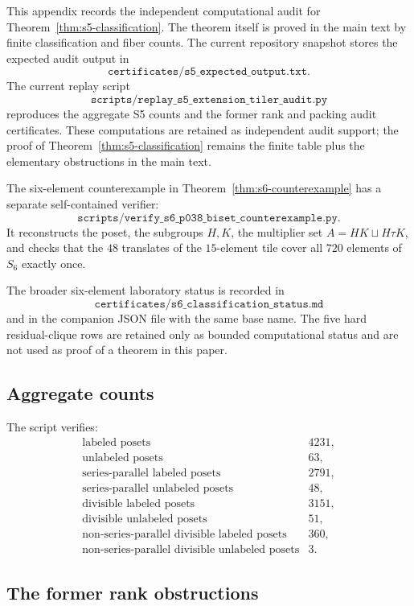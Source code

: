 This appendix records the independent computational audit for
Theorem~\ref{thm:s5-classification}.  The theorem itself is proved in the
main text by finite classification and fiber counts.  The current
repository snapshot stores the expected audit output in
\[
\texttt{certificates/s5\_expected\_output.txt}.
\]
The current replay script
\[
\texttt{scripts/replay\_s5\_extension\_tiler\_audit.py}
\]
reproduces the aggregate S5 counts and the former rank and packing audit
certificates.  These computations are retained as independent audit
support; the proof of Theorem~\ref{thm:s5-classification} remains the
finite table plus the elementary obstructions in the main text.

The six-element counterexample in Theorem~\ref{thm:s6-counterexample} has
a separate self-contained verifier:
\[
\texttt{scripts/verify\_s6\_p038\_biset\_counterexample.py}.
\]
It reconstructs the poset, the subgroups $H,K$, the multiplier set
$A=HK\sqcup H\tau K$, and checks that the $48$ translates of the
$15$-element tile cover all $720$ elements of $S_6$ exactly once.

The broader six-element laboratory status is recorded in
\[
\texttt{certificates/s6\_classification\_status.md}
\]
and in the companion JSON file with the same base name.  The five hard
residual-clique rows are retained only as bounded computational status and
are not used as proof of a theorem in this paper.

\subsection*{Aggregate counts}

The script verifies:
\[
\begin{array}{lr}
\text{labeled posets} & 4231,\\
\text{unlabeled posets} & 63,\\
\text{series-parallel labeled posets} & 2791,\\
\text{series-parallel unlabeled posets} & 48,\\
\text{divisible labeled posets} & 3151,\\
\text{divisible unlabeled posets} & 51,\\
\text{non-series-parallel divisible labeled posets} & 360,\\
\text{non-series-parallel divisible unlabeled posets} & 3.
\end{array}
\]

\subsection*{The former rank obstructions}

